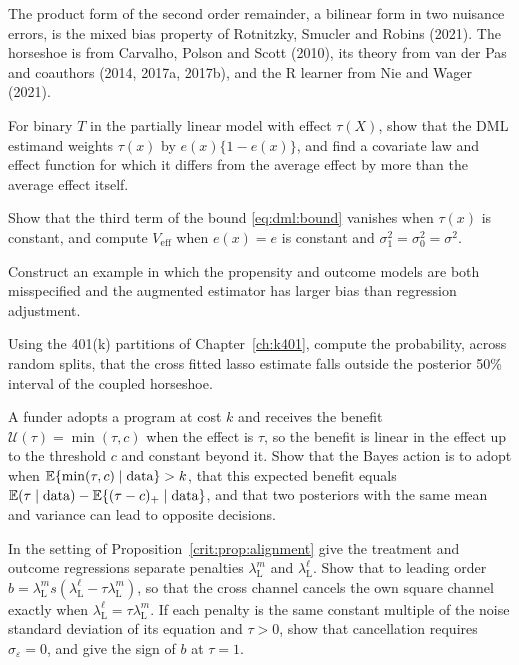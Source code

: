 The product form of the second order remainder, a bilinear form in two nuisance errors, is the mixed bias property of Rotnitzky, Smucler and Robins (2021). The horseshoe is from Carvalho, Polson and Scott (2010), its theory from van der Pas and coauthors (2014, 2017a, 2017b), and the R learner from Nie and Wager (2021).

\begin{exercises}
\item\label{ex:chcrit:1} For binary $T$ in the partially linear model with effect $\tau(X)$, show that the DML estimand weights $\tau(x)$ by $e(x)\{1 - e(x)\}$, and find a covariate law and effect function for which it differs from the average effect by more than the average effect itself.
\item\label{ex:chcrit:2} Show that the third term of the bound \eqref{eq:dml:bound} vanishes when $\tau(x)$ is constant, and compute $V_{\mathrm{eff}}$ when $e(x) = e$ is constant and $\sigma_1^2 = \sigma_0^2 = \sigma^2$.
\item\label{ex:chcrit:3} Construct an example in which the propensity and outcome models are both misspecified and the augmented estimator has larger bias than regression adjustment.
\item\label{ex:chcrit:4} Using the 401(k) partitions of Chapter~\ref{ch:k401}, compute the probability, across random splits, that the cross fitted lasso estimate falls outside the posterior 50\% interval of the coupled horseshoe.
\item\label{ex:chcrit:5} A funder adopts a program at cost $k$ and receives the benefit $\mathcal{U}(\tau) = \min(\tau, c)$ when the effect is $\tau$, so the benefit is linear in the effect up to the threshold $c$ and constant beyond it. Show that the Bayes action is to adopt when $\mathbb{E}\{\min(\tau, c) \mid \text{data}\} > k$, that this expected benefit equals $\mathbb{E}(\tau \mid \text{data}) - \mathbb{E}\{(\tau - c)_+ \mid \text{data}\}$, and that two posteriors with the same mean and variance can lead to opposite decisions.
\item\label{ex:chcrit:6} In the setting of Proposition~\ref{crit:prop:alignment} give the treatment and outcome regressions separate penalties $\lambda_{\mathrm L}^m$ and $\lambda_{\mathrm L}^\ell$. Show that to leading order $b = \lambda_{\mathrm L}^m s(\lambda_{\mathrm L}^\ell - \tau\lambda_{\mathrm L}^m)$, so that the cross channel cancels the own square channel exactly when $\lambda_{\mathrm L}^\ell = \tau\lambda_{\mathrm L}^m$. If each penalty is the same constant multiple of the noise standard deviation of its equation and $\tau > 0$, show that cancellation requires $\sigma_\varepsilon = 0$, and give the sign of $b$ at $\tau = 1$.

\end{exercises}
